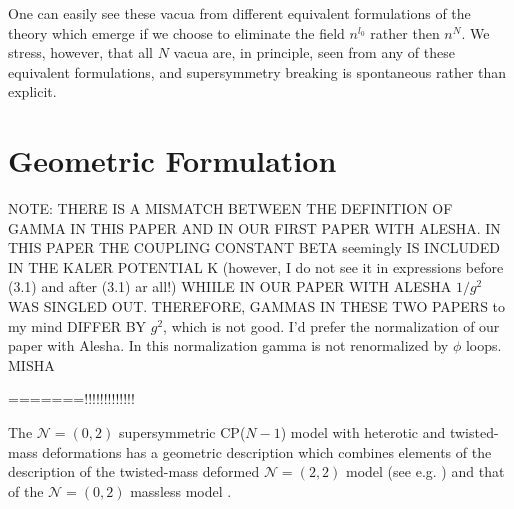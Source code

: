 \documentclass[12pt]{article}
\newcommand{\ntwot}{${\mathcal N}= \left(2,2\right) $ }
\newcommand{\ntwoo}{${\mathcal N}= \left(0,2\right) $ }
\begin{document}
One can easily see these vacua from different equivalent formulations of the theory which emerge if  we choose to eliminate the
field $n^{l_0}$ rather then $n^N$. We stress, however, that
all $N$ vacua are, in principle, seen from any of these
equivalent formulations, and supersymmetry breaking is spontaneous
rather than explicit.

\section{Geometric Formulation}
\label{geomf}	
\setcounter{equation}{0}


NOTE: THERE IS A MISMATCH BETWEEN THE DEFINITION OF GAMMA
IN THIS PAPER AND IN OUR FIRST PAPER WITH ALESHA.
IN THIS PAPER THE COUPLING CONSTANT BETA
seemingly  IS INCLUDED IN THE KALER POTENTIAL K
(however, I do not see it in expressions before (3.1)
and after (3.1) ar all!)
WHIILE IN OUR PAPER WITH ALESHA $1/g^2$ WAS SINGLED OUT.
THEREFORE, GAMMAS IN  THESE TWO PAPERS to my mind DIFFER BY
$g^2$, which is not good. I'd prefer
the normalization of our paper with Alesha.
In this normalization gamma is not renormalized by $\phi$ loops. MISHA

=======!!!!!!!!!!!!!

	
	The \ntwoo supersymmetric CP($N-1$) model   with heterotic and twisted-mass deformations has  a geometric description which combines elements of
	the  description of the twisted-mass deformed
	\ntwot model (see e.g. \cite{SVZw}) and that of the \ntwoo massless model
	\cite{SYhet}.
	
\end{document}
